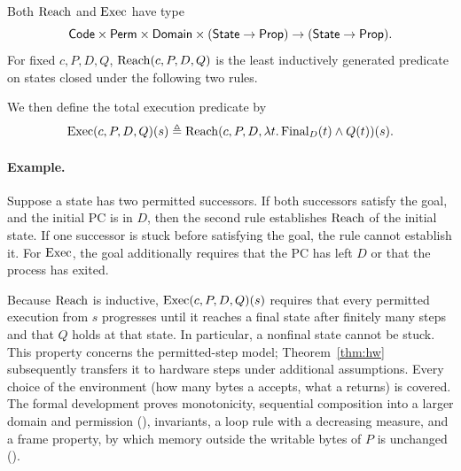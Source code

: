 \begin{definition}\label{def:exec}
Both $\mathrm{Reach}$ and $\mathrm{Exec}$ have type
\[\mathsf{Code}\times\mathsf{Perm}\times\mathsf{Domain}\times(\mathsf{State}\to\mathsf{Prop})\to(\mathsf{State}\to\mathsf{Prop}).\]
For fixed $c,P,D,Q$, $\mathrm{Reach}(c,P,D,Q)$ is the least inductively generated predicate on states closed under the following two rules.
We then define the total execution predicate by
\[\mathrm{Exec}(c,P,D,Q)(s)\triangleq\mathrm{Reach}(c,P,D,\lambda t.\,\mathrm{Final}_D(t)\land Q(t))(s).\]
\end{definition}

\paragraph{Example.} Suppose a state has two permitted successors. If both successors satisfy the goal, and the initial PC is in $D$, then the second rule establishes $\mathrm{Reach}$ of the initial state. If one successor is stuck before satisfying the goal, the rule cannot establish it. For $\mathrm{Exec}$, the goal additionally requires that the PC has left $D$ or that the process has exited.


Because $\mathrm{Reach}$ is inductive, $\mathrm{Exec}(c,P,D,Q)(s)$ requires that every permitted execution from $s$ progresses until it reaches a final state after finitely many steps and that $Q$ holds at that state. In particular, a nonfinal state cannot be stuck. This property concerns the permitted-step model; Theorem~\ref{thm:hw} subsequently transfers it to hardware steps under additional assumptions. Every choice of the environment (how many bytes a  accepts, what a  returns) is covered. The formal development proves monotonicity, sequential composition into a larger domain and permission (), invariants, a loop rule with a decreasing measure, and a frame property, by which memory outside the writable bytes of $P$ is unchanged ().

